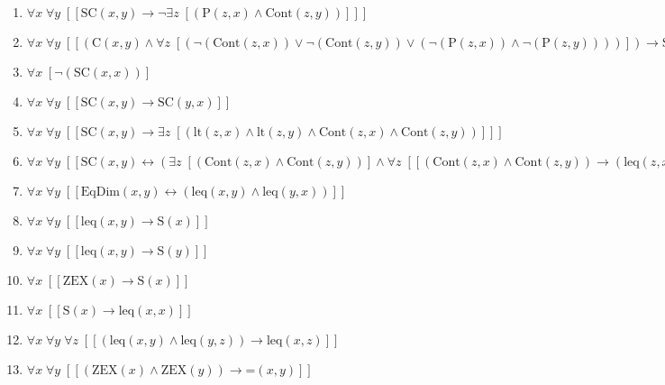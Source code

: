 \documentclass{article}
\begin{document}
\begin{enumerate}
\item $\forall x\; \forall y\;  \left[ \left[ \textrm{SC}(x,y) \rightarrow \neg \exists z\;  \left[ \left(\textrm{P}(z,x) \land \textrm{Cont}(z,y)\right) \right] \right] \right]$
\item $\forall x\; \forall y\;  \left[ \left[ \left(\textrm{C}(x,y) \land \forall z\;  \left[ \left(\neg \left(\textrm{Cont}(z,x)\right) \lor \neg \left(\textrm{Cont}(z,y)\right) \lor \left(\neg \left(\textrm{P}(z,x)\right) \land \neg \left(\textrm{P}(z,y)\right)\right)\right) \right]\right) \rightarrow \textrm{SC}(x,y) \right] \right]$
\item $\forall x\;  \left[ \neg \left(\textrm{SC}(x,x)\right) \right]$
\item $\forall x\; \forall y\;  \left[ \left[ \textrm{SC}(x,y) \rightarrow \textrm{SC}(y,x) \right] \right]$
\item $\forall x\; \forall y\;  \left[ \left[ \textrm{SC}(x,y) \rightarrow \exists z\;  \left[ \left(\textrm{lt}(z,x) \land \textrm{lt}(z,y) \land \textrm{Cont}(z,x) \land \textrm{Cont}(z,y)\right) \right] \right] \right]$
\item $\forall x\; \forall y\;  \left[ \left[ \textrm{SC}(x,y) \leftrightarrow \left(\exists z\;  \left[ \left(\textrm{Cont}(z,x) \land \textrm{Cont}(z,y)\right) \right] \land \forall z\;  \left[ \left[ \left(\textrm{Cont}(z,x) \land \textrm{Cont}(z,y)\right) \rightarrow \left(\textrm{leq}(z,x) \land \neg \left(\textrm{EqDim}(z,x)\right) \land \textrm{leq}(z,y) \land \neg \left(\textrm{EqDim}(z,y)\right)\right) \right] \right]\right) \right] \right]$
\item $\forall x\; \forall y\;  \left[ \left[ \textrm{EqDim}(x,y) \leftrightarrow \left(\textrm{leq}(x,y) \land \textrm{leq}(y,x)\right) \right] \right]$
\item $\forall x\; \forall y\;  \left[ \left[ \textrm{leq}(x,y) \rightarrow \textrm{S}(x) \right] \right]$
\item $\forall x\; \forall y\;  \left[ \left[ \textrm{leq}(x,y) \rightarrow \textrm{S}(y) \right] \right]$
\item $\forall x\;  \left[ \left[ \textrm{ZEX}(x) \rightarrow \textrm{S}(x) \right] \right]$
\item $\forall x\;  \left[ \left[ \textrm{S}(x) \rightarrow \textrm{leq}(x,x) \right] \right]$
\item $\forall x\; \forall y\; \forall z\;  \left[ \left[ \left(\textrm{leq}(x,y) \land \textrm{leq}(y,z)\right) \rightarrow \textrm{leq}(x,z) \right] \right]$
\item $\forall x\; \forall y\;  \left[ \left[ \left(\textrm{ZEX}(x) \land \textrm{ZEX}(y)\right) \rightarrow \textrm{=}(x,y) \right] \right]$

\end{enumerate}
\end{document}
